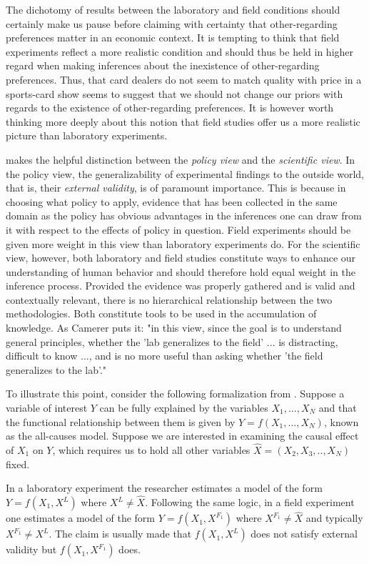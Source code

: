 \documentclass[12pt]{article}
\begin{document}
The dichotomy of results between the laboratory and field conditions should certainly make us pause before claiming with certainty that other-regarding preferences matter in an economic context. It is tempting to think that field experiments reflect a more realistic condition and should thus be held in higher regard when making inferences about the inexistence of other-regarding preferences. Thus, that card dealers do not seem to match quality with price in a sports-card show seems to suggest that we should not change our priors with regards to the existence of other-regarding preferences. It is however worth thinking more deeply about this notion that field studies offer us a more realistic picture than laboratory experiments.

\cite{camerer2011promise} makes the helpful distinction between the \textit{policy view} and the \textit{scientific view}. In the policy view, the generalizability of experimental findings to the outside world, that is, their \textit{external validity}, is of paramount importance. This is because in choosing what policy to apply, evidence that has been collected in the same domain as the policy has obvious advantages in the inferences one can draw from it with respect to the effects of policy in question. Field experiments should be given more weight in this view than laboratory experiments do. For the scientific view, however, both laboratory and field studies constitute  ways to enhance our understanding of human behavior and should therefore hold equal weight in the inference process. Provided the evidence was properly gathered and is valid and contextually relevant, there is no hierarchical relationship between the two methodologies. Both constitute tools to be used in the accumulation of knowledge. As Camerer puts it: "in this view, since the goal is to understand general principles, whether the 'lab generalizes to the field' ... is distracting, difficult to know ..., and is no more useful than asking whether 'the field generalizes to the lab'."

To illustrate this point, consider the following formalization from \cite{Falk2009}. Suppose a variable of interest $Y$ can be fully explained by the variables $X_1,...,X_N$ and that the functional relationship between them is given by $Y=f\left(X_1,...,X_N\right)$, known as the all-causes model. Suppose we are interested in examining the causal effect of $X_1$ on $Y$, which requires us to hold all other variables $\hat{X} = \left(X_2,X_3,.., X_N\right)$ fixed.

In a laboratory experiment the researcher estimates a model of the form $Y=f\left(X_1,X^L\right)$ where $X^L \neq \hat{X}$. Following the same logic, in a field experiment one estimates a model of the form $Y=f\left(X_1,X^{F_1}\right)$ where $X^{F_1} \neq \hat{X}$ and typically $X^{F_1} \neq X^L$. The claim is usually made that $f\left(X_1,X^L\right)$ does not satisfy external validity but $f\left(X_1,X^{F_1}\right)$ does.
\end{document}
